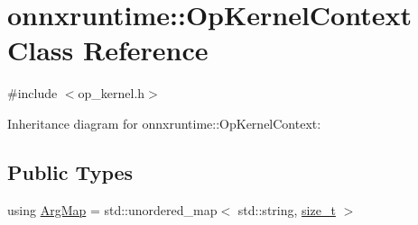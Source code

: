 \hypertarget{classonnxruntime_1_1OpKernelContext}{}\section{onnxruntime\+:\+:Op\+Kernel\+Context Class Reference}
\label{classonnxruntime_1_1OpKernelContext}


{\ttfamily \#include $<$op\+\_\+kernel.\+h$>$}



Inheritance diagram for onnxruntime\+:\+:Op\+Kernel\+Context\+:
\subsection*{Public Types}
\begin{DoxyCompactItemize}
\item 
using \mbox{\hyperlink{classonnxruntime_1_1OpKernelContext_ae0b5ac00d35dcfd43bbc28f655f92fe1}{Arg\+Map}} = std\+::unordered\+\_\+map$<$ std\+::string, \mbox{\hyperlink{mlasi_8h_a503efbc1c6e50825320ad909366b78ab}{size\+\_\+t}} $>$
\end{DoxyCompactItemize}
